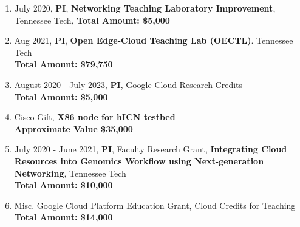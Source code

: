 \begin{enumerate}
  \item July 2020, \textbf{PI}, \textbf{Networking Teaching Laboratory Improvement}, Tennessee Tech, \textbf{ Total Amount: \$5,000}
  
  \item Aug 2021, \textbf{PI}, \textbf{Open Edge-Cloud Teaching Lab (OECTL)}. Tennessee Tech\\ \textbf{Total Amount: \$79,750}

\item August 2020 - July 2023, \textbf{PI}, Google Cloud Research Credits\\ \textbf{Total Amount: \$5,000}

\item Cisco Gift, \textbf{X86 node for hICN testbed}\\ \textbf{Approximate Value \$35,000}


\item July 2020 - June 2021, \textbf{PI}, Faculty Research Grant, \textbf{Integrating Cloud Resources into Genomics Workflow using Next-generation Networking},  Tennessee Tech\\ \textbf{Total Amount: \$10,000}

 \item Misc. Google Cloud Platform Education Grant, Cloud Credits for Teaching\\ \textbf{Total Amount: \$14,000 }
 
 
\end{enumerate}

 
 
    
     
      
      
      
      
